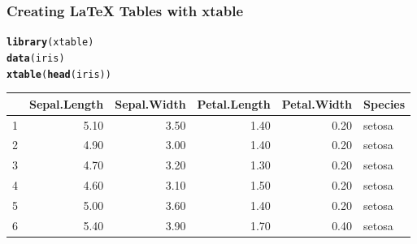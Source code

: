 \documentclass{beamer}\usepackage[]{graphicx}\usepackage[]{color}
\makeatletter
\newcommand{\hlstd}[1]{\textcolor[rgb]{0.345,0.345,0.345}{#1}}%
\newcommand{\hlkwd}[1]{\textcolor[rgb]{0.737,0.353,0.396}{\textbf{#1}}}%
\newenvironment{kframe}{%
 \def\at@end@of@kframe{}%
 \ifinner\ifhmode%
  \def\at@end@of@kframe{\end{minipage}}%
  \begin{minipage}{\columnwidth}%
 \fi\fi%
 \def\FrameCommand##1{\hskip\@totalleftmargin \hskip-\fboxsep
 \colorbox{shadecolor}{##1}\hskip-\fboxsep
     \hskip-\linewidth \hskip-\@totalleftmargin \hskip\columnwidth}%
 \MakeFramed {\advance\hsize-\width
   \@totalleftmargin\z@ \linewidth\hsize
   \@setminipage}}%
 {\par\unskip\endMakeFramed%
 \at@end@of@kframe}
\newenvironment{knitrout}{}{} %
\makeatother
\begin{document}

\begin{frame}[fragile]
\frametitle{Creating LaTeX Tables with xtable}
\begin{knitrout}\footnotesize
{}\color{fgcolor}\begin{kframe}
\begin{alltt}
\hlkwd{library}\hlstd{(xtable)}
\hlkwd{data}\hlstd{(iris)}
\hlkwd{xtable}\hlstd{(}\hlkwd{head}\hlstd{(iris))}
\end{alltt}
\end{kframe}
\end{knitrout}

{\footnotesize
\begin{table}[ht]
\centering
\begin{tabular}{rrrrrl}
  \hline
 & Sepal.Length & Sepal.Width & Petal.Length & Petal.Width & Species \\ 
  \hline
1 & 5.10 & 3.50 & 1.40 & 0.20 & setosa \\ 
  2 & 4.90 & 3.00 & 1.40 & 0.20 & setosa \\ 
  3 & 4.70 & 3.20 & 1.30 & 0.20 & setosa \\ 
  4 & 4.60 & 3.10 & 1.50 & 0.20 & setosa \\ 
  5 & 5.00 & 3.60 & 1.40 & 0.20 & setosa \\ 
  6 & 5.40 & 3.90 & 1.70 & 0.40 & setosa \\ 
   \hline
\end{tabular}
\end{table}


}
\end{frame}

\end{document}
